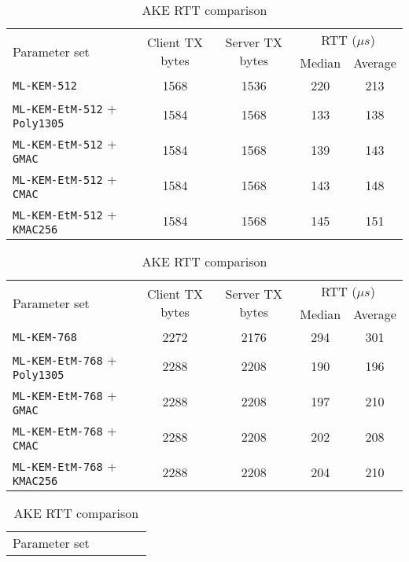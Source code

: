 \documentclass[runningheads]{llncs}
\newcommand{\us}{\mu s}
\begin{document}
\begin{table}[h]
    \centering
    \footnotesize
    \caption{AKE RTT comparison}\label{tbl:ake-rtt}
    \begin{tabular}{|p{14em}|c|c|c|c|}
        \hline
        \multirow{2}{*}{Parameter set}
        & \multirow{2}{*}{Client TX bytes}
        & \multirow{2}{*}{Server TX bytes}
        & \multicolumn{2}{|c|}{RTT ($\us$)} \\
        \cline{4-5}
        & & & Median & Average \\
        \hline
        \texttt{ML-KEM-512} & 1568 & 1536 & 220 & 213 \\
        \hline
        \texttt{ML-KEM-EtM-512} + \texttt{Poly1305} & 1584 & 1568 & 133 & 138 \\
        \hline
        \texttt{ML-KEM-EtM-512} + \texttt{GMAC} & 1584 & 1568 & 139 & 143 \\
        \hline
        \texttt{ML-KEM-EtM-512} + \texttt{CMAC} & 1584 & 1568 & 143 & 148 \\
        \hline
        \texttt{ML-KEM-EtM-512} + \texttt{KMAC256} & 1584 & 1568 & 145 & 151 \\
        \hline
    \end{tabular}\vspace{0.3cm}
    \begin{tabular}{|p{14em}|c|c|c|c|}
        \hline
        \multirow{2}{*}{Parameter set}
        & \multirow{2}{*}{Client TX bytes}
        & \multirow{2}{*}{Server TX bytes}
        & \multicolumn{2}{|c|}{RTT ($\us$)} \\
        \cline{4-5}
        & & & Median & Average \\
        \hline
        \texttt{ML-KEM-768} & 2272 & 2176 & 294 & 301 \\
        \hline
        \texttt{ML-KEM-EtM-768} + \texttt{Poly1305} & 2288 & 2208 & 190 & 196 \\
        \hline
        \texttt{ML-KEM-EtM-768} + \texttt{GMAC} & 2288 & 2208 & 197 & 210 \\
        \hline
        \texttt{ML-KEM-EtM-768} + \texttt{CMAC} & 2288 & 2208 & 202 & 208 \\
        \hline
        \texttt{ML-KEM-EtM-768} + \texttt{KMAC256} & 2288 & 2208 & 204 & 210 \\
        \hline
    \end{tabular}\vspace{0.3cm}
    \begin{tabular}{|p{14em}|c|c|c|c|}
        \hline
        \multirow{2}{*}{Parameter set}

\end{tabular}
\end{table}
\end{document}
